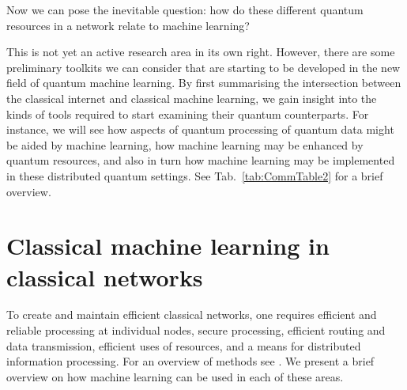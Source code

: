 \documentclass[twocolumn, aps, rmp, amsmath, amssymb, nofootinbib, superscriptaddress, longbibliography, floatfix, table-of-contents, eqsecnum]{revtex4}
\begin{document}
Now we can pose the inevitable question: how do these different quantum resources in a network relate to machine learning?

This is not yet an active research area in its own right. However, there are some preliminary toolkits we can consider that are starting to be developed in the new field of quantum machine learning. By first summarising the intersection between the classical internet and classical machine learning, we gain insight into the kinds of tools required to start examining their quantum counterparts. For instance, we will see how aspects of quantum processing of quantum data might be aided by machine learning, how machine learning may be enhanced by quantum resources, and also in turn how machine learning may be implemented in these distributed quantum settings. See Tab.~\ref{tab:CommTable2} for a brief overview. 


\section{Classical machine learning in classical networks}

To create and maintain efficient classical networks, one requires efficient and reliable processing at individual nodes, secure processing, efficient routing and data transmission, efficient uses of resources, and a means for distributed information processing. For an overview of methods see \cite{bib:boutaba2018comprehensive, bib:wang2018machine}. We present a brief overview on how machine learning can be used in each of these areas. 
\end{document}
